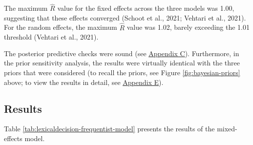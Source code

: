 \documentclass[
  12pt,
  man,floatsintext]{apa7}
\begin{document}
The maximum \(\widehat R\) value for the fixed effects across the three models was 1.00, suggesting that these effects converged (Schoot et al., 2021; Vehtari et al., 2021). For the random effects, the maximum \(\widehat R\) value was 1.02, barely exceeding the 1.01 threshold (Vehtari et al., 2021).

The posterior predictive checks were sound (see \protect\hyperlink{appendix-C-Bayesian-analysis-diagnostics}{\underline{Appendix C}}). Furthermore, in the prior sensitivity analysis, the results were virtually identical with the three priors that were considered (to recall the priors, see Figure \ref{fig:bayesian-priors} above; to view the results in detail, see \protect\hyperlink{appendix-E-Bayesian-analysis-results}{\underline{Appendix E}}).

\hypertarget{results-2}{%
\subsection{Results}\label{results-2}}

Table \ref{tab:lexicaldecision-frequentist-model} presents the results of the mixed-effects model.
\end{document}

